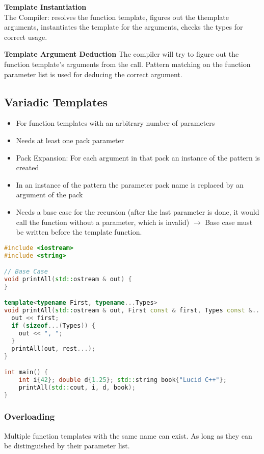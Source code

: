 \textbf{Template Instantiation}\\
The Compiler: resolves the function template, figures out the themplate arguments, instantiates the template for the arguments, checks the types for correct usage.

\textbf{Template Argument Deduction}
 The compiler will try to figure out the function template's arguments from the call. Pattern matching on the function parameter list is used for deducing the correct argument.


\subsection{Variadic Templates}
\begin{itemize}
  \itemsep -0.5em 
  \item For function templates with an arbitrary number of parameters
  \item Needs at least one pack parameter
  \item Pack Expansion: For each argument in that pack an instance of the pattern is created
  \item In an instance of the pattern the parameter pack name is replaced by an argument of the pack
  \item Needs a base case for the recursion (after the last parameter is done, it would call the function without a parameter, which is invalid) $\rightarrow$ Base case must be written before the template function.
\end{itemize}
\begin{lstlisting}[language=C++]
#include <iostream>
#include <string>

// Base Case 
void printAll(std::ostream & out) {
}

template<typename First, typename...Types>
void printAll(std::ostream & out, First const & first, Types const &...rest) {
  out << first;
  if (sizeof...(Types)) {
    out << ", ";
  }
  printAll(out, rest...);
}

int main() {
	int i{42}; double d{1.25}; std::string book{"Lucid C++"};
	printAll(std::cout, i, d, book);
}
\end{lstlisting}

\subsubsection{Overloading}
Multiple function templates with the same name can exist. As long as they can be distinguished by their parameter list.

